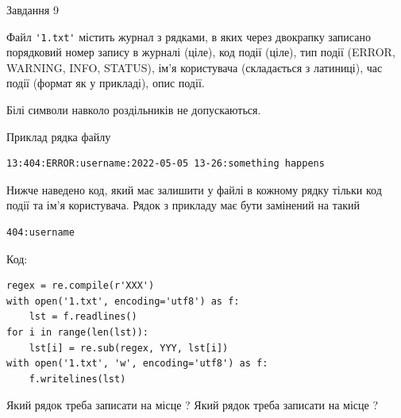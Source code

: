 \documentclass[12pt, ukrainian]{article}
\def\code#1{\Verb!#1!}
\begin{document}
{\begin{minipage}[t]{8.0cm}
\end{minipage}

               
{\begin{center}Завдання {9}\end{center}}
\vspace{-4mm}
Файл \code{'1.txt'} містить журнал з рядками, в яких через двокрапку записано поряд\-ко\-вий номер запису в журналі (ціле), код події (ціле), тип події (ERROR, \\WARNING, INFO, STATUS), ім'я користувача (складається з латиниці), час події (фор\-мат як у прикладі), опис події.

Білі символи навколо роздільників не допускаються.

Приклад рядка файлу



\begin{verbatim}
13:404:ERROR:username:2022-05-05 13-26:something happens
\end{verbatim}


Нижче наведено код, який має залишити у файлі в кожному рядку тільки код події та ім'я користувача. Рядок з прикладу має бути замінений на такий



\begin{verbatim}
404:username
\end{verbatim}




Код:



\begin{verbatim}
regex = re.compile(r'XXX')
with open('1.txt', encoding='utf8') as f:
    lst = f.readlines()
for i in range(len(lst)):
    lst[i] = re.sub(regex, YYY, lst[i])
with open('1.txt', 'w', encoding='utf8') as f:
    f.writelines(lst)
\end{verbatim}





Який рядок треба записати на місце  ?
Який рядок треба записати на місце  ?\par

}
\end{document}
